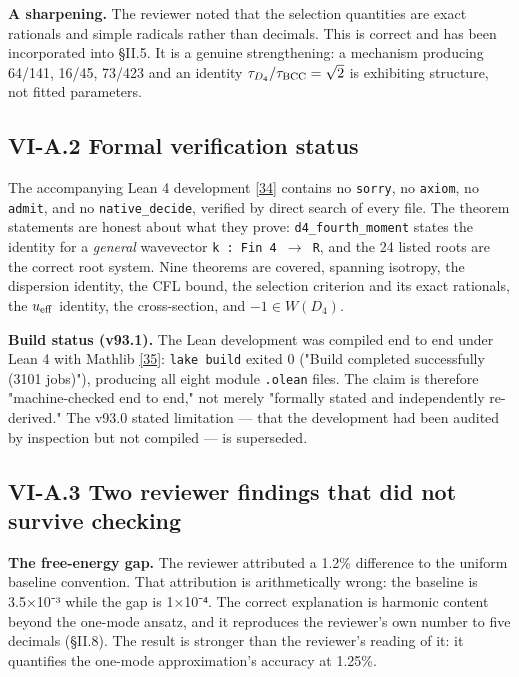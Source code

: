 \documentclass[a4paper,11pt]{article}
\begin{document}
\textbf{A sharpening.} The reviewer noted that the selection quantities are exact rationals and simple radicals rather than decimals. This is correct and has been incorporated into §II.5. It is a genuine strengthening: a mechanism producing 64/141, 16/45, 73/423 and an identity $\tau_{D_4}/\tau_{\rm BCC} = \sqrt{2}$ is exhibiting structure, not fitted parameters.

\subsection*{VI-A.2 Formal verification status}

The accompanying Lean 4 development \hyperref[ref34]{[34]} contains no \texttt{sorry}, no \texttt{axiom}, no \texttt{admit}, and no \texttt{native\_decide}, verified by direct search of every file. The theorem statements are honest about what they prove: \texttt{d4\_fourth\_moment} states the identity for a \textit{general} wavevector \texttt{k : Fin 4 $\to$ R}, and the 24 listed roots are the correct root system. Nine theorems are covered, spanning isotropy, the dispersion identity, the CFL bound, the selection criterion and its exact rationals, the $u_{\rm eff}$ identity, the cross-section, and $-1\in W(D_4)$.

\textbf{Build status (v93.1).} The Lean development was compiled end to end under Lean 4 with Mathlib \hyperref[ref35]{[35]}: \texttt{lake build} exited 0 ("Build completed successfully (3101 jobs)"), producing all eight module \texttt{.olean} files. The claim is therefore "machine-checked end to end," not merely "formally stated and independently re-derived." The v93.0 stated limitation — that the development had been audited by inspection but not compiled — is superseded.

\subsection*{VI-A.3 Two reviewer findings that did not survive checking}

\textbf{The free-energy gap.} The reviewer attributed a 1.2\% difference to the uniform baseline convention. That attribution is arithmetically wrong: the baseline is 3.5×10⁻³ while the gap is 1×10⁻⁴. The correct explanation is harmonic content beyond the one-mode ansatz, and it reproduces the reviewer's own number to five decimals (§II.8). The result is stronger than the reviewer's reading of it: it quantifies the one-mode approximation's accuracy at 1.25\%.
\end{document}
